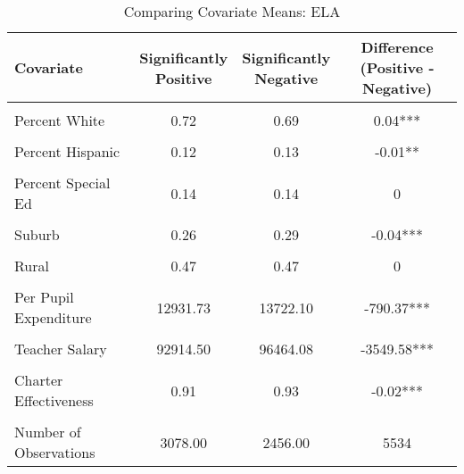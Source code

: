 \begin{table}[H]%
\centering
\caption{\label{tab:cov_means_ela}Comparing Covariate Means: ELA}
\centering
\begin{tabular}[t]{lccc}
\toprule
Covariate & \makecell[c]{Significantly\\Positive} & \makecell[c]{Significantly\\Negative} & \makecell[c]{Difference\\(Positive - Negative)}\\
\midrule
\cellcolor{gray!10}{Log of Enrollment} & \cellcolor{gray!10}{7.49} & \cellcolor{gray!10}{7.49} & \cellcolor{gray!10}{0}\\
Percent White & 0.72 & 0.69 & 0.04***\\
\cellcolor{gray!10}{Percent Black} & \cellcolor{gray!10}{0.08} & \cellcolor{gray!10}{0.11} & \cellcolor{gray!10}{-0.03***}\\
Percent Hispanic & 0.12 & 0.13 & -0.01**\\
\cellcolor{gray!10}{Percent Free/Reduced Lunch} & \cellcolor{gray!10}{0.48} & \cellcolor{gray!10}{0.48} & \cellcolor{gray!10}{0}\\
Percent Special Ed & 0.14 & 0.14 & 0\\
\cellcolor{gray!10}{Urban} & \cellcolor{gray!10}{0.07} & \cellcolor{gray!10}{0.07} & \cellcolor{gray!10}{0}\\
Suburb & 0.26 & 0.29 & -0.04***\\
\cellcolor{gray!10}{Town} & \cellcolor{gray!10}{0.21} & \cellcolor{gray!10}{0.17} & \cellcolor{gray!10}{0.04***}\\
Rural & 0.47 & 0.47 & 0\\
\cellcolor{gray!10}{Per Pupil Revenue} & \cellcolor{gray!10}{13043.15} & \cellcolor{gray!10}{13863.70} & \cellcolor{gray!10}{-820.55***}\\
Per Pupil Expenditure & 12931.73 & 13722.10 & -790.37***\\
\cellcolor{gray!10}{Student-Teacher Ratio} & \cellcolor{gray!10}{15.18} & \cellcolor{gray!10}{15.07} & \cellcolor{gray!10}{0.11}\\
Teacher Salary & 92914.50 & 96464.08 & -3549.58***\\
\cellcolor{gray!10}{Number of Magnet Schools} & \cellcolor{gray!10}{0.40} & \cellcolor{gray!10}{0.65} & \cellcolor{gray!10}{-0.25**}\\
Charter Effectiveness & 0.91 & 0.93 & -0.02***\\
\cellcolor{gray!10}{Baseline Performance} & \cellcolor{gray!10}{0.13} & \cellcolor{gray!10}{0.12} & \cellcolor{gray!10}{0.01}\\
\midrule
Number of Observations & 3078.00 & 2456.00 & 5534\\
\bottomrule
\end{tabular}
\end{table}
